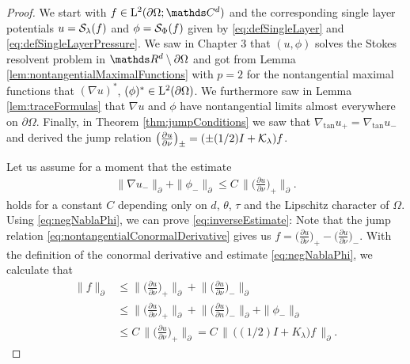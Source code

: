 \begin{proof}
  We start with $f \in \Ell^2(\partial\Omega; \C^d)$ and the corresponding single layer potentials $u = \mathcal{S}_\lambda(f)$ and $\phi = \mathcal{S}_\Phi(f)$ given by \eqref{eq:defSingleLayer} and \eqref{eq:defSingleLayerPressure}.
  We saw in Chapter 3 that $(u,\phi)$ solves the Stokes resolvent problem in $\R^d \setminus \partial\Omega$ and got from Lemma \ref{lem:nontangentialMaximalFunctions} with $p = 2$ for the nontangential maximal functions that $(\nabla u)^*$, $(\phi)^* \in \mathrm{L}^2(\partial\Omega)$.
  We furthermore saw in Lemma \ref{lem:traceFormulas} that $\nabla u$ and $\phi$ have nontangential limits almost everywhere on $\partial\Omega$. 
  Finally, in Theorem \ref{thm:jumpConditions} we saw that $\nabla_{\mathrm{tan}} u_+ = \nabla_{\mathrm{tan}} u_-$ and derived the jump relation $\big(\frac{\partial u}{\partial \nu}\big)_\pm = (\pm (1/2) I + \mathcal{K}_\lambda) f$.

  Let us assume for a moment that the estimate
  \begin{align}
    \label{eq:negNablaPhi}
    \| \nabla u_- \|^{}_\partial + \| \phi_- \|^{}_\partial \leq C \, \Big\| \bigg( \frac{\partial u}{\partial \nu} \bigg)_+ \Big\|^{}_\partial .
  \end{align}
  holds for a constant $C$ depending only on $d$, $\theta$, $\tau$ and the Lipschitz character of $\Omega$. 
  Using \eqref{eq:negNablaPhi}, we can prove \eqref{eq:inverseEstimate}:
  Note that the jump relation \eqref{eq:nontangentialConormalDerivative} gives us $f = \big(\frac{\partial u}{\partial \nu} \big)_+ -  \big( \frac{\partial u}{\partial \nu} \big)_-$.
  With the definition of the conormal derivative and estimate \eqref{eq:negNablaPhi}, we calculate that
  \begin{align*}
    \| f\|^{}_\partial 
    &\leq  \Big\|    \bigg( \frac{\partial u}{\partial \nu} \bigg)_+ \Big\|^{}_\partial + \Big\|  \bigg( \frac{\partial u}{\partial \nu} \bigg)_- \Big\|^{}_\partial  \\[0.5em]
    &\leq \Big\|     \bigg( \frac{\partial u}{\partial \nu} \bigg)_+  \Big\|^{}_\partial + \Big\| \bigg( \frac{\partial u}{\partial n}   \bigg)_- \Big\|^{}_\partial + \| \phi_- \|^{}_\partial  \\[0.5em]
    &\leq C\, \Big\| \bigg( \frac{\partial u}{\partial \nu} \bigg)_+ \Big\|^{}_\partial
    = C\, \big\| \, \big((1/2)I + K_\lambda\big) f\, \big\|^{}_\partial.
  \end{align*}


\end{proof}
